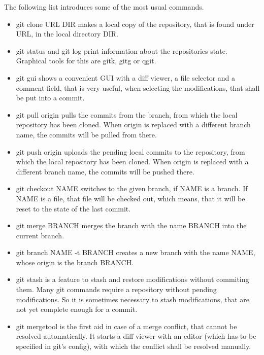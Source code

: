 			The following list introduces some of the most usual commands.
			\begin{itemize}
				\item {\normalfont \ttfamily git clone URL DIR} makes a local copy of the repository, that is found under {\normalfont \ttfamily URL}, in the local directory {\normalfont \ttfamily DIR}.
				\item {\normalfont \ttfamily git status} and {\normalfont \ttfamily git log} print information about the repositories state. Graphical tools for this are {\normalfont \ttfamily gitk}, {\normalfont \ttfamily gitg} or {\normalfont \ttfamily qgit}.
				\item {\normalfont \ttfamily git gui} shows a convenient GUI with a diff viewer, a file selector and a comment field, that is very useful, when selecting the modifications, that shall be put into a commit.
				\item {\normalfont \ttfamily git pull origin} pulls the commits from the branch, from which the local repository has been cloned. When {\normalfont \ttfamily origin} is replaced with a different branch name, the commits will be pulled from there.
				\item {\normalfont \ttfamily git push origin} uploads the pending local commits to the repository, from which the local repository has been cloned. When {\normalfont \ttfamily origin} is replaced with a different branch name, the commits will be pushed there.
				\item {\normalfont \ttfamily git checkout NAME} switches to the given branch, if {\normalfont \ttfamily NAME} is a branch. If {\normalfont \ttfamily NAME} is a file, that file will be checked out, which means, that it will be reset to the state of the last commit.
				\item {\normalfont \ttfamily git merge BRANCH} merges the branch with the name {\normalfont \ttfamily BRANCH} into the current branch.
				\item {\normalfont \ttfamily git branch NAME -t BRANCH} creates a new branch with the name {\normalfont \ttfamily NAME}, whose origin is the branch {\normalfont \ttfamily BRANCH}.
				\item {\normalfont \ttfamily git stash} is a feature to stash and restore modifications without commiting them. Many git commands require a repository without pending modifications. So it is sometimes necessary to stash modifications, that are not yet complete enough for a commit.
				\item {\normalfont \ttfamily git mergetool} is the first aid in case of a merge conflict, that cannot be resolved automatically. It starts a diff viewer with an editor (which has to be specified in git's config), with which the conflict shall be resolved manually.

\end{itemize}
